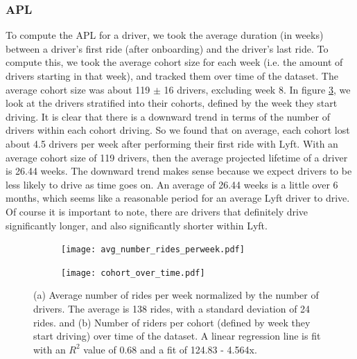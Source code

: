 \documentclass{report}
\begin{document}
	\subsubsection{APL}

		To compute the APL for a driver, we took the average duration (in weeks) between a driver's first ride (after onboarding) and the driver's last ride. To compute this, we took the average cohort size for each week (i.e. the amount of drivers starting in that week), and tracked them over time of the dataset. The average cohort size was about 119 $\pm$ 16 drivers, excluding week 8. In figure \ref{fig:driver_cohort_over_time}, we look at the drivers stratified into their cohorts, defined by the week they start driving. It is clear that there is a downward trend in terms of the number of drivers within each cohort driving. So we found that on average, each cohort lost about 4.5 drivers per week after performing their first ride with Lyft. With an average cohort size of 119 drivers, then the average projected lifetime of a driver is 26.44 weeks. The downward trend makes sense because we expect drivers to be less likely to drive as time goes on. An average of 26.44 weeks is a little over 6 months, which seems like a reasonable period for an average Lyft driver to drive. Of course it is important to note, there are drivers that definitely drive significantly longer, and also significantly shorter within Lyft.

		\begin{figure}[!htb]
			\centering
			\begin{subfigure}[t]{0.49\textwidth}
			\texttt{[image: avg\_number\_rides\_perweek.pdf]}
			\caption{}
			\label{fig:avg_rides_perweek}
			\end{subfigure}
			\centering
			\begin{subfigure}[t]{0.49\textwidth}
			\texttt{[image: cohort\_over\_time.pdf]}
			\caption{}
			\label{fig:driver_cohort_over_time}
			\end{subfigure}
			\caption{(a) Average number of rides per week normalized by the number of drivers. The average is 138 rides, with a standard deviation of 24 rides. and (b) Number of riders per cohort (defined by week they start driving) over time of the dataset. A linear regression line is fit with an $R^2$ value of 0.68 and a fit of 124.83 - 4.564x.}
		\end{figure} 
\end{document}
